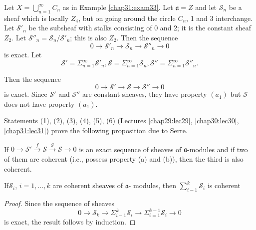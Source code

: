 \begin{exam}%
Let $X = \bigcup^{\infty}_{n=1} C_n$ as in Example
\ref{chap31:exam33}. Let $\mathfrak{a} =Z$ 
and let $\mathscr{S}_n$ be a sheaf which is locally $Z_4$, but on
going around the circle $C_n$, 1 and 3 interchange. Let
$\mathscr{S}'_n$ be the subsheaf with stalks consisting of 0 and
2; it is the constant sheaf $Z_2$. Let $\mathscr{S''}_n =
\mathscr{S}_n / \mathscr{S'}_n $; this is also $Z_2$. Then the
sequence 
$$ 
0 \rightarrow \mathscr{S'}_n \rightarrow \mathscr{S}_n \rightarrow
\mathscr{S''}_n \rightarrow 0 
$$
is exact. Let  
$$
\mathscr{S'} =  \Sigma^{\infty}_{n=1} \mathscr{S'}_n, \mathscr{S} =
\Sigma^{\infty}_{n=1} \mathscr{S}_n, \mathscr{S''} =
\Sigma^{\infty}_{n=1} \mathscr{S''}_n. 
$$

Then the sequence
$$
 0 \rightarrow \mathscr{S'} \rightarrow \mathscr{S} \rightarrow 
 \mathscr{S''} \rightarrow 0 
$$
is exact. Since $\mathscr{S'}$ and $\mathscr{S''}$ are constant
sheaves, they have property $(a_1)$ but $\mathscr{S}$ does not have
property $(a_1)$. 
\end{exam}

Statements (1), (2), (3), (4), (5), (6) (Lectures \ref{chap29:lec29},
\ref{chap30:lec30}, \ref{chap31:lec31}) 
prove the following proposition due to Serre. 

\begin{proposition}%
If $0 \rightarrow \mathscr{S'} \xrightarrow{f} \mathscr{S}
\xrightarrow{g} \mathscr{S} \rightarrow 0$ is an exact sequence
  of sheaves of $\mathfrak{a}$-modules and if two of them are
  coherent (i.e., possess property (a) and (b)), then the
  third is also coherent. 
\end{proposition}

\begin{coro*}
If\pageoriginale $\mathscr{S}_i$, $i= 1, \ldots , k$ are coherent sheaves of
$\mathfrak{a}$- modules, then $\sum^k_{i-1} \mathscr{S}_i$ is coherent  
\end{coro*}

\begin{proof}
Since the sequence of sheaves 
$$
0 \rightarrow \mathscr{S}_k \rightarrow \Sigma^k_{i-1} \mathscr{S}_i
\rightarrow \Sigma^{k-1}_{i=1} \mathscr{S}_i \rightarrow 0 
$$
is exact, the result follows by induction. 
\end{proof}


